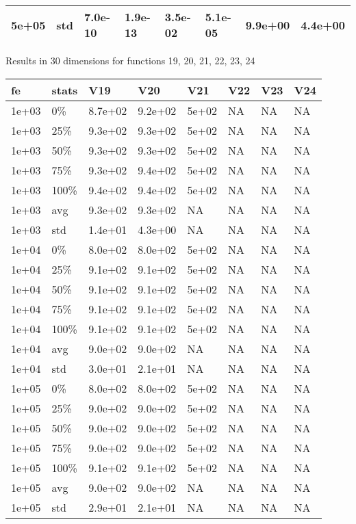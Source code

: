\documentclass[11pt]{article}
\begin{document}
{\begin{longtable}{llllllll}
  5e+05 & std & 7.0e-10 & 1.9e-13 & 3.5e-02 & 5.1e-05 & 9.9e+00 & 4.4e+00 \\ 
   \hline
\hline
\end{longtable}
\newpage
Results in 30 dimensions for functions 19, 20, 21, 22, 23, 24
\begin{longtable}{llllllll}
  \hline
fe & stats & V19 & V20 & V21 & V22 & V23 & V24 \\ 
  \hline
1e+03 & 0\% & 8.7e+02 & 9.2e+02 & 5e+02 & NA & NA & NA \\ 
  1e+03 & 25\% & 9.3e+02 & 9.3e+02 & 5e+02 & NA & NA & NA \\ 
  1e+03 & 50\% & 9.3e+02 & 9.3e+02 & 5e+02 & NA & NA & NA \\ 
  1e+03 & 75\% & 9.3e+02 & 9.4e+02 & 5e+02 & NA & NA & NA \\ 
  1e+03 & 100\% & 9.4e+02 & 9.4e+02 & 5e+02 & NA & NA & NA \\ 
  1e+03 & avg & 9.3e+02 & 9.3e+02 &    NA & NA & NA & NA \\ 
  1e+03 & std & 1.4e+01 & 4.3e+00 &    NA & NA & NA & NA \\ 
  1e+04 & 0\% & 8.0e+02 & 8.0e+02 & 5e+02 & NA & NA & NA \\ 
  1e+04 & 25\% & 9.1e+02 & 9.1e+02 & 5e+02 & NA & NA & NA \\ 
  1e+04 & 50\% & 9.1e+02 & 9.1e+02 & 5e+02 & NA & NA & NA \\ 
  1e+04 & 75\% & 9.1e+02 & 9.1e+02 & 5e+02 & NA & NA & NA \\ 
  1e+04 & 100\% & 9.1e+02 & 9.1e+02 & 5e+02 & NA & NA & NA \\ 
  1e+04 & avg & 9.0e+02 & 9.0e+02 &    NA & NA & NA & NA \\ 
  1e+04 & std & 3.0e+01 & 2.1e+01 &    NA & NA & NA & NA \\ 
  1e+05 & 0\% & 8.0e+02 & 8.0e+02 & 5e+02 & NA & NA & NA \\ 
  1e+05 & 25\% & 9.0e+02 & 9.0e+02 & 5e+02 & NA & NA & NA \\ 
  1e+05 & 50\% & 9.0e+02 & 9.0e+02 & 5e+02 & NA & NA & NA \\ 
  1e+05 & 75\% & 9.0e+02 & 9.0e+02 & 5e+02 & NA & NA & NA \\ 
  1e+05 & 100\% & 9.1e+02 & 9.1e+02 & 5e+02 & NA & NA & NA \\ 
  1e+05 & avg & 9.0e+02 & 9.0e+02 &    NA & NA & NA & NA \\ 
  1e+05 & std & 2.9e+01 & 2.1e+01 &    NA & NA & NA & NA \\ 

\end{longtable}}
\end{document}
